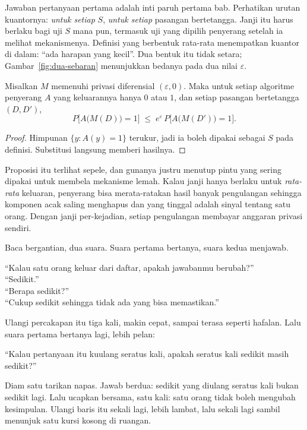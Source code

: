 Jawaban pertanyaan pertama adalah inti paruh pertama bab. Perhatikan urutan kuantornya:
\emph{untuk setiap} $S$, \emph{untuk setiap} pasangan bertetangga. Janji itu harus
berlaku bagi uji $S$ mana pun, termasuk uji yang dipilih penyerang setelah ia melihat
mekanismenya. Definisi yang berbentuk rata-rata menempatkan kuantor di dalam: ``ada
harapan yang kecil''. Dua bentuk itu tidak setara; Gambar~\ref{fig:dua-sebaran}
menunjukkan bedanya pada dua nilai $\varepsilon$.

\begin{proposisi}
Misalkan $M$ memenuhi privasi diferensial $(\varepsilon,0)$. Maka untuk setiap algoritme
penyerang $A$ yang keluarannya hanya $0$ atau $1$, dan setiap pasangan bertetangga
$(D,D')$,
\begin{equation}
P\bigl[A\bigl(M(D)\bigr)=1\bigr] \;\le\; e^{\varepsilon}\,
P\bigl[A\bigl(M(D')\bigr)=1\bigr] .
\end{equation}
\end{proposisi}

\begin{proof}
Himpunan $\{y : A(y)=1\}$ terukur, jadi ia boleh dipakai sebagai $S$ pada definisi.
Substitusi langsung memberi hasilnya.
\end{proof}

Proposisi itu terlihat sepele, dan gunanya justru menutup pintu yang sering dipakai
untuk membela mekanisme lemah. Kalau janji hanya berlaku untuk \emph{rata-rata}
keluaran, penyerang bisa merata-ratakan hasil banyak pengulangan sehingga komponen acak
saling menghapus dan yang tinggal adalah sinyal tentang satu orang. Dengan janji
per-kejadian, setiap pengulangan membayar anggaran privasi sendiri.

\begin{bacakeras}
Baca bergantian, dua suara. Suara pertama bertanya, suara kedua menjawab.

``Kalau satu orang keluar dari daftar, apakah jawabanmu berubah?''\\
``Sedikit.''\\
``Berapa sedikit?''\\
``Cukup sedikit sehingga tidak ada yang bisa memastikan.''

Ulangi percakapan itu tiga kali, makin cepat, sampai terasa seperti hafalan. Lalu
suara pertama bertanya lagi, lebih pelan:

``Kalau pertanyaan itu kuulang seratus kali, apakah seratus kali sedikit masih
sedikit?''

Diam satu tarikan napas. Jawab berdua: sedikit yang diulang seratus kali bukan sedikit
lagi. Lalu ucapkan bersama, satu kali: satu orang tidak boleh mengubah kesimpulan.
Ulangi baris itu sekali lagi, lebih lambat, lalu sekali lagi sambil menunjuk satu kursi
kosong di ruangan.
\end{bacakeras}

